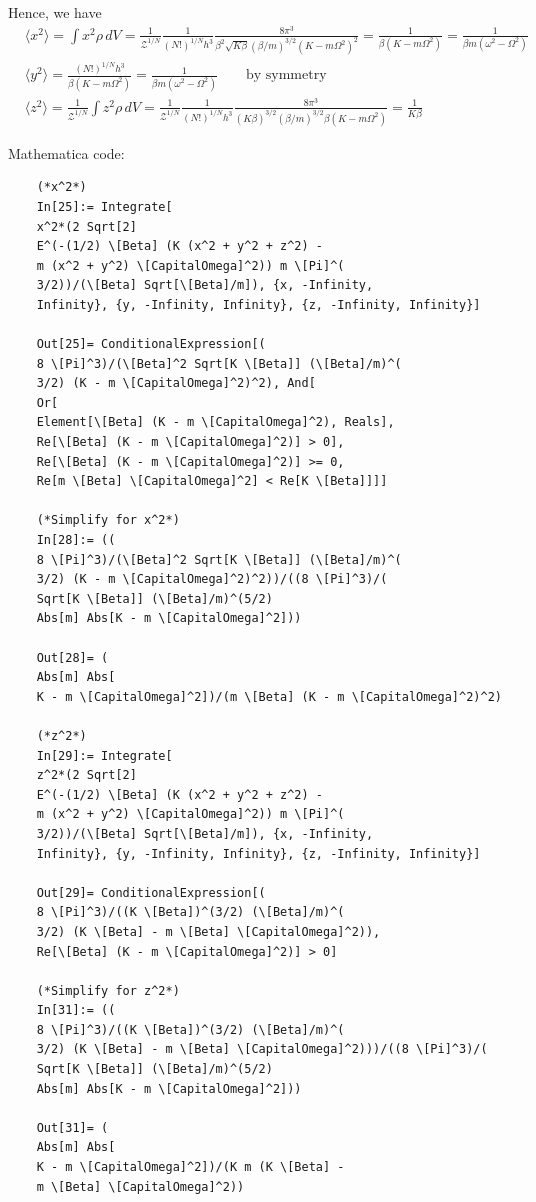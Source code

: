\documentclass{article}
\theoremstyle{definition}
\newcommand{\be}{\beta}
\newcommand{\f}[2]{\frac{#1}{#2}}
\begin{document}
\begin{enumerate}[label=(\alph*)]
	Hence, we have 
	\begin{align*}
	&\langle x^2 \rangle = \int x^2 \rho\,dV =  \f{1}{\mathcal{Z}^{1/N}} \f{1}{(N!)^{1/N}h^3}\f{8\pi^3}{\be^2\sqrt{K\be}( \be/m)^{3/2}(K-m\Omega^2)^2}  = \f{1}{\be(K-m\Omega^2)} = \boxed{\f{1}{\be m (\omega^2 - \Omega^2)}}\\
	&\langle y^2 \rangle = \f{(N!)^{1/N}h^3}{\be(K-m\Omega^2)}= \boxed{\f{1}{\be m (\omega^2 - \Omega^2)}} \quad\quad \text{by symmetry}\\
	&\langle z^2 \rangle = \f{1}{\mathcal{Z}^{1/N}}\int z^2 \rho\,dV = \f{1}{\mathcal{Z}^{1/N}} \f{1}{(N!)^{1/N}h^3}\f{8\pi^3}{(K\be)^{3/2}(\be/m)^{3/2}\be (K-m\Omega^2)}   = \boxed{\f{1}{K\be}}
	\end{align*}
	
	Mathematica code:
	\begin{lstlisting}
	(*x^2*)
	In[25]:= Integrate[
	x^2*(2 Sqrt[2]
	E^(-(1/2) \[Beta] (K (x^2 + y^2 + z^2) - 
	m (x^2 + y^2) \[CapitalOmega]^2)) m \[Pi]^(
	3/2))/(\[Beta] Sqrt[\[Beta]/m]), {x, -Infinity, 
	Infinity}, {y, -Infinity, Infinity}, {z, -Infinity, Infinity}]
	
	Out[25]= ConditionalExpression[(
	8 \[Pi]^3)/(\[Beta]^2 Sqrt[K \[Beta]] (\[Beta]/m)^(
	3/2) (K - m \[CapitalOmega]^2)^2), And[
	Or[
	Element[\[Beta] (K - m \[CapitalOmega]^2), Reals], 
	Re[\[Beta] (K - m \[CapitalOmega]^2)] > 0], 
	Re[\[Beta] (K - m \[CapitalOmega]^2)] >= 0, 
	Re[m \[Beta] \[CapitalOmega]^2] < Re[K \[Beta]]]]
	
	(*Simplify for x^2*)
	In[28]:= ((
	8 \[Pi]^3)/(\[Beta]^2 Sqrt[K \[Beta]] (\[Beta]/m)^(
	3/2) (K - m \[CapitalOmega]^2)^2))/((8 \[Pi]^3)/(
	Sqrt[K \[Beta]] (\[Beta]/m)^(5/2)
	Abs[m] Abs[K - m \[CapitalOmega]^2]))
	
	Out[28]= (
	Abs[m] Abs[
	K - m \[CapitalOmega]^2])/(m \[Beta] (K - m \[CapitalOmega]^2)^2)
	
	(*z^2*)
	In[29]:= Integrate[
	z^2*(2 Sqrt[2]
	E^(-(1/2) \[Beta] (K (x^2 + y^2 + z^2) - 
	m (x^2 + y^2) \[CapitalOmega]^2)) m \[Pi]^(
	3/2))/(\[Beta] Sqrt[\[Beta]/m]), {x, -Infinity, 
	Infinity}, {y, -Infinity, Infinity}, {z, -Infinity, Infinity}]
	
	Out[29]= ConditionalExpression[(
	8 \[Pi]^3)/((K \[Beta])^(3/2) (\[Beta]/m)^(
	3/2) (K \[Beta] - m \[Beta] \[CapitalOmega]^2)), 
	Re[\[Beta] (K - m \[CapitalOmega]^2)] > 0]
	
	(*Simplify for z^2*)
	In[31]:= ((
	8 \[Pi]^3)/((K \[Beta])^(3/2) (\[Beta]/m)^(
	3/2) (K \[Beta] - m \[Beta] \[CapitalOmega]^2)))/((8 \[Pi]^3)/(
	Sqrt[K \[Beta]] (\[Beta]/m)^(5/2)
	Abs[m] Abs[K - m \[CapitalOmega]^2]))
	
	Out[31]= (
	Abs[m] Abs[
	K - m \[CapitalOmega]^2])/(K m (K \[Beta] - 
	m \[Beta] \[CapitalOmega]^2))
	\end{lstlisting}
\end{enumerate}
\end{document}
